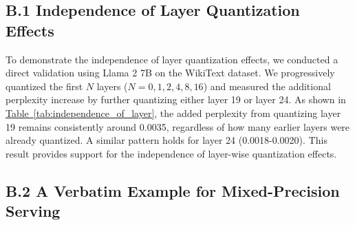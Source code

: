 \subsection*{B.1 \quad Independence of Layer Quantization Effects}
\label{appendix:layer_independence}

To demonstrate the independence of layer quantization effects, we conducted a direct validation using Llama 2 7B on the WikiText dataset. We progressively quantized the first $N$ layers ($N = 0, 1, 2, 4, 8, 16$) and measured the additional perplexity increase by further quantizing either layer 19 or layer 24. As shown in \hyperref[tab:independence_of_layer]{Table~\ref{tab:independence_of_layer}}, the added perplexity from quantizing layer 19 remains consistently around 0.0035, regardless of how many earlier layers were already quantized. A similar pattern holds for layer 24 (0.0018-0.0020). This result provides support for the independence of layer-wise quantization effects.



\begin{table}[h]
\caption{Evaluating independence of layer-wise quantization effects on perplexity under different quantization conditions.}
\label{tab:independence_of_layer}
\centering
{}
\end{table}


\subsection*{B.2 \quad A Verbatim Example for Mixed-Precision Serving}\label{appendix:verbatim_example}

